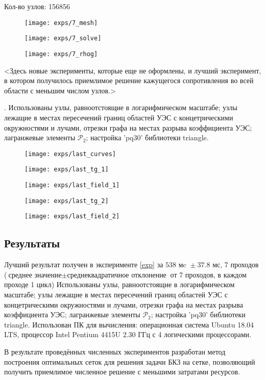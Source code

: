 Кол-во узлов: 156856

\begin{figure}[H]
  \texttt{[image: exps/7\_mesh]}
\end{figure}
\begin{figure}[H]
  \texttt{[image: exps/7\_solve]}
\end{figure}
\begin{figure}[H]
  \texttt{[image: exps/7\_rhog]}
\end{figure}

<Здесь новые эксперименты, которые еще не оформлены,
и лучший эксперимент, в котором получилось приемлимое решение кажущегося сопротивления во всей области
с меньшим числом узлов.>

 \theexp \label{best}.
Использованы узлы, равноотстоящие в логарифмическом масштабе;
узлы лежащие в местах пересечений границ областей УЭС с концетрическими окружностями и лучами,
отрезки графа на местах разрыва коэффициента УЭС; лагранжевые элементы $\mathcal{P}_2$; настройка 'pq30' библиотеки triangle.

\begin{figure}[H]
\texttt{[image: exps/last\_curves]}
\caption{}
\end{figure}

\begin{figure}[H]
\centering
\texttt{[image: exps/last\_tg\_1]}
\caption{}
\end{figure}

\begin{figure}[H]
\centering
\texttt{[image: exps/last\_field\_1]}
\caption{}
\end{figure}

\begin{figure}[H]
\texttt{[image: exps/last\_tg\_2]}
\caption{}
\end{figure}

\begin{figure}[H]
\texttt{[image: exps/last\_field\_2]}
\caption{}
\end{figure}


\subsection{Результаты}

Лучший результат получен в эксперименте \ref{exp} за $538 \text{ мc } \pm 37.8 \text{ мс}$, 7 проходов
($\text{среднее значение} \pm \text{среднеквадратичное отклонение}$ от 7 проходов, в каждом проходе 1 цикл)
Использованы узлы, равноотстоящие в логарифмическом масштабе;
узлы лежащие в местах пересечений границ областей УЭС с концетрическими окружностями и лучами,
отрезки графа на местах разрыва коэффициента УЭС; лагранжевые элементы $\mathcal{P}_2$; настройка 'pq30' библиотеки triangle.
Использован ПК для вычисления: операционная система Ubuntu 18.04 LTS, процессор Intel Pentium 4415U 2.30 ГГц с 4 логическими процессорами.

В результате проведённых численных экспериментов разработан метод построения оптимальных сеток
для решения задачи БКЗ на сетке, позволяющий получить приемлимое численное решение с меньшими затратами ресурсов.

\clearpage